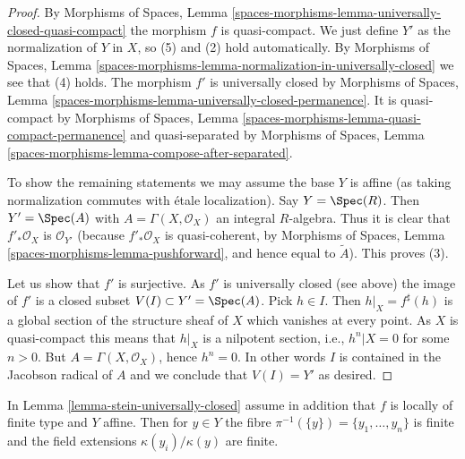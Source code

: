 \begin{proof}
By Morphisms of Spaces, Lemma
\ref{spaces-morphisms-lemma-universally-closed-quasi-compact}
the morphism $f$ is quasi-compact.
We just define $Y'$ as the normalization of $Y$ in $X$, so (5) and (2) hold
automatically. By
Morphisms of Spaces, Lemma
\ref{spaces-morphisms-lemma-normalization-in-universally-closed}
we see that (4) holds. The morphism $f'$ is universally closed by
Morphisms of Spaces, Lemma
\ref{spaces-morphisms-lemma-universally-closed-permanence}.
It is quasi-compact by
Morphisms of Spaces, Lemma
\ref{spaces-morphisms-lemma-quasi-compact-permanence}
and quasi-separated by
Morphisms of Spaces, Lemma
\ref{spaces-morphisms-lemma-compose-after-separated}.

\medskip\noindent
To show the remaining statements we may assume the base $Y$ is affine
(as taking normalization commutes with \'etale localization).
Say $Y = \Spec(R)$. Then $Y' = \Spec(A)$ with
$A = \Gamma(X, \mathcal{O}_X)$ an integral $R$-algebra.
Thus it is clear that $f'_*\mathcal{O}_X$
is $\mathcal{O}_{Y'}$ (because $f'_*\mathcal{O}_X$ is quasi-coherent,
by Morphisms of Spaces, Lemma
\ref{spaces-morphisms-lemma-pushforward},
and hence equal to $\widetilde{A}$). This proves (3).

\medskip\noindent
Let us show that $f'$ is surjective. As $f'$ is universally closed (see above)
the image of $f'$ is a closed subset
$V(I) \subset Y' = \Spec(A)$. Pick $h \in I$. Then
$h|_X = f^\sharp(h)$ is a global section of the structure sheaf of
$X$ which vanishes at every point. As $X$ is quasi-compact this means
that $h|_X$ is a nilpotent section, i.e., $h^n|X = 0$ for some $n > 0$.
But $A = \Gamma(X, \mathcal{O}_X)$, hence $h^n = 0$.
In other words $I$ is contained in the Jacobson radical of $A$ and we conclude
that $V(I) = Y'$ as desired.
\end{proof}

\begin{lemma}
\label{lemma-stein-universally-closed-residue-fields}
In Lemma \ref{lemma-stein-universally-closed} assume in addition that
$f$ is locally of finite type and $Y$ affine. Then for $y \in Y$ the fibre
$\pi^{-1}(\{y\}) = \{y_1, \ldots, y_n\}$ is finite and the field extensions
$\kappa(y_i)/\kappa(y)$ are finite.
\end{lemma}

